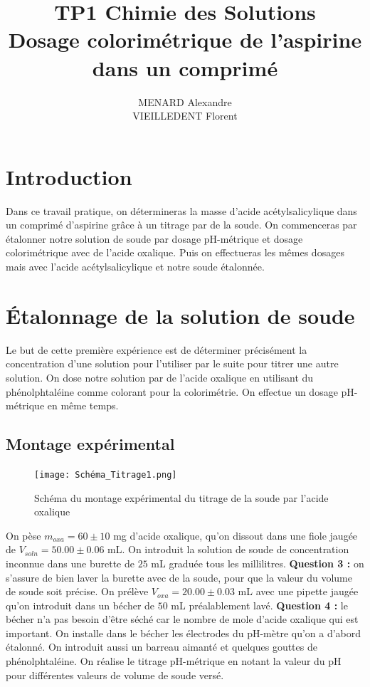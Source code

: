 \documentclass[12pt]{article}
\title{\textbf{TP1 Chimie des Solutions} \\ Dosage colorimétrique de l’aspirine dans un comprimé}
\author{MENARD Alexandre \\ VIEILLEDENT Florent}
\begin{document}
\maketitle

\section*{Introduction}

Dans ce travail pratique, on détermineras la masse d'acide acétylsalicylique dans un comprimé d'aspirine grâce à un titrage par de la soude. 
On commenceras par étalonner notre solution de soude par dosage pH-métrique et dosage colorimétrique avec de l'acide oxalique. Puis on effectueras les mêmes dosages mais avec l'acide acétylsalicylique et notre soude étalonnée. 
\newpage

\section{Étalonnage de la solution de soude}

Le but de cette première expérience est de déterminer précisément la concentration d'une solution pour l'utiliser par le suite pour titrer une autre solution. On dose notre solution par de l'acide oxalique en utilisant du phénolphtaléine comme colorant pour la colorimétrie. On effectue un dosage pH-métrique en même temps. 

	\subsection{Montage expérimental}
	
\begin{figure}[!h]
	\begin{center}
\texttt{[image: Schéma\_Titrage1.png]}
\label{Schéma_Titrage1}
\caption{Schéma du montage expérimental du titrage de la soude par l'acide oxalique}
\end{center}
\end{figure}

On pèse $m_{oxa}=60\pm 10$ mg d'acide oxalique, qu'on dissout dans une fiole jaugée de $V_{soln}=50.00\pm 0.06$ mL. On introduit la solution de soude de concentration inconnue dans une burette de $25$ mL graduée tous les millilitres. \textbf{Question 3 :} on s'assure de bien laver la burette avec de la soude, pour que la valeur du volume de soude soit précise. On prélève $V_{oxa}=20.00\pm 0.03$ mL avec une pipette jaugée qu'on introduit dans un bécher de $50$ mL préalablement lavé. \textbf{Question 4 :} le bécher n'a pas besoin d'être séché car le nombre de mole d'acide oxalique qui est important. On installe dans le bécher les électrodes du pH-mètre qu'on a d'abord étalonné. On introduit aussi un barreau aimanté et quelques gouttes de phénolphtaléine. On réalise le titrage pH-métrique en notant la valeur du pH pour différentes valeurs de volume de soude versé. 
	
\end{document}
